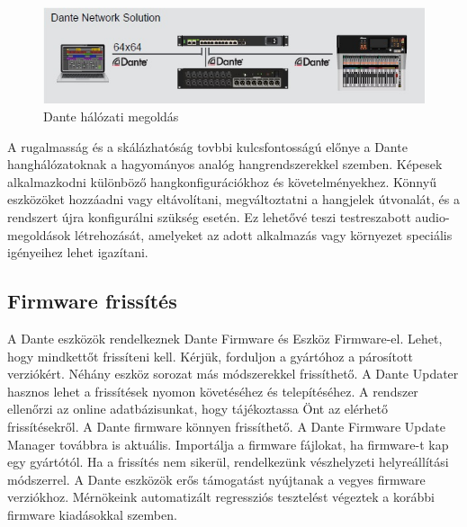 \begin{figure}[H]
	\centering
	\includegraphics[width=\linewidth, keepaspectratio]{figures/dante-solution.jpg}
	\caption{Dante hálózati megoldás}
	\label {fig:dante-solution}
\end{figure}

A rugalmasság és a skálázhatóság tovbbi kulcsfontosságú előnye a Dante
hanghálózatoknak a hagyományos analóg hangrendszerekkel szemben.
Képesek alkalmazkodni különböző hangkonfigurációkhoz és követelményekhez. 
Könnyű eszközöket hozzáadni vagy eltávolítani, megváltoztatni a hangjelek útvonalát, és a rendszert újra
konfigurálni szükség esetén. Ez lehetővé teszi testreszabott audio-megoldások
létrehozását, amelyeket az adott alkalmazás vagy környezet speciális igényeihez
lehet igazítani. 

\subsection{Firmware frissítés}

A Dante eszközök rendelkeznek Dante Firmware és Eszköz Firmware-el.
Lehet, hogy mindkettőt frissíteni kell. Kérjük, forduljon a gyártóhoz a párosított verziókért.
Néhány eszköz sorozat más módszerekkel frissíthető.
A Dante Updater hasznos lehet a frissítések nyomon követéséhez és telepítéséhez.
A rendszer ellenőrzi az online adatbázisunkat, hogy tájékoztassa Önt az elérhető frissítésekről.
A Dante firmware könnyen frissíthető.
A Dante Firmware Update Manager továbbra is aktuális.
Importálja a firmware fájlokat, ha firmware-t kap egy gyártótól.
Ha a frissítés nem sikerül, rendelkezünk vészhelyzeti helyreállítási módszerrel.
A Dante eszközök erős támogatást nyújtanak a vegyes firmware verziókhoz.
Mérnökeink automatizált regressziós tesztelést végeztek a korábbi firmware kiadásokkal szemben.

